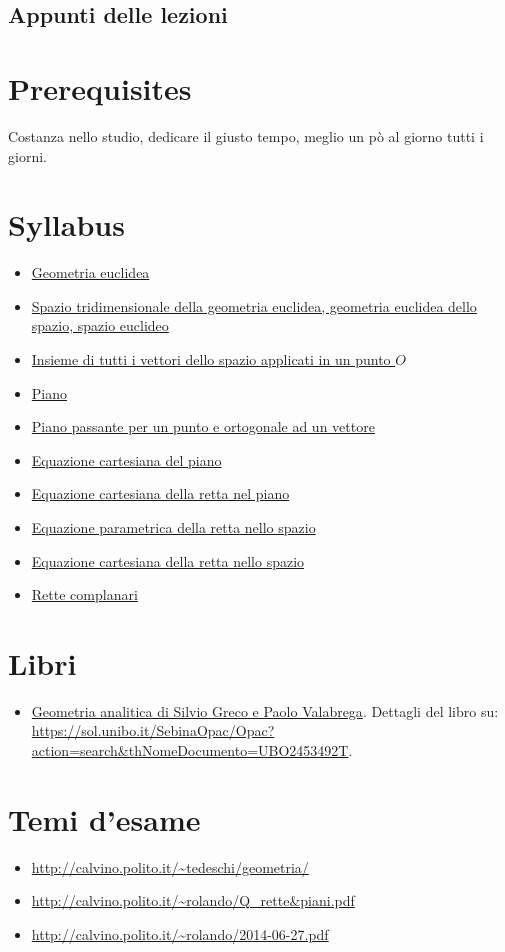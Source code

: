 \documentclass[a4paper,10pt]{article}
\begin{document}
\subsection{Appunti delle lezioni}

\section{Prerequisites}
Costanza nello studio, dedicare il giusto tempo, meglio un pò al giorno tutti i giorni.

\section{Syllabus}
  \begin{itemize}
   \item \href{./GeometriaEuclidea.html}{Geometria euclidea}
   \item \href{./GeometriaEuclidea3d.html}{Spazio tridimensionale della geometria euclidea, geometria euclidea dello spazio, spazio euclideo}
   \item \href{./InsiemeVettoriApplicati.html}{Insieme di tutti i vettori dello spazio applicati in un punto $O$}
   \item \href{./Piano.html}{Piano}
   \item \href{./PianoPassantePunto.html}{Piano passante per un punto e ortogonale ad un vettore}
   \item \href{./EquazioneCartesianaPiano.html}{Equazione cartesiana del piano}
   \item \href{./EquazioneCartesianaRettaPiano.html}{Equazione cartesiana della retta nel piano}
   \item \href{./EquazioneParametricaRettaSpazio.html}{Equazione parametrica della retta nello spazio}
   \item \href{./EquazioneCartesianaRetta.html}{Equazione cartesiana della retta nello spazio}
   \item \href{./RetteComplanari.html}{Rette complanari}
  \end{itemize}
  
\section{Libri}
  \begin{itemize}
   \item \href{./libro001.html}{Geometria analitica di Silvio Greco e Paolo Valabrega}. Dettagli del libro su: \url{https://sol.unibo.it/SebinaOpac/Opac?action=search&thNomeDocumento=UBO2453492T}.
  \end{itemize}

\section{Temi d'esame}
  \begin{itemize}
   \item \url{http://calvino.polito.it/~tedeschi/geometria/}
   \item \url{http://calvino.polito.it/~rolando/Q_rette&piani.pdf}
   \item \url{http://calvino.polito.it/~rolando/2014-06-27.pdf}
  \end{itemize}
\end{document}
